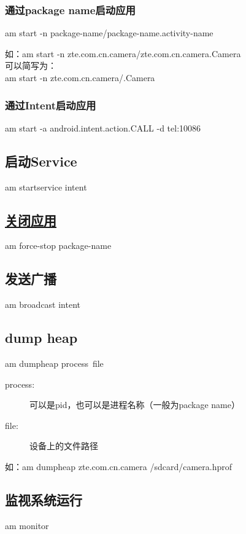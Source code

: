 ﻿\documentclass[a4paper,11pt]{article}
\begin{document}
  \subsubsection[通过package name启动应用]{通过package name启动应用}
  am start -n \lt package-name\gt/\lt package-name.activity-name\gt

  如：am start -n zte.com.cn.camera/zte.com.cn.camera.Camera\\
  可以简写为：\\
  am start -n zte.com.cn.camera/.Camera

  \subsubsection[通过Intent启动应用]{通过Intent启动应用}
  am start -a android.intent.action.CALL -d tel:10086

  \subsection[启动Service]{启动Service}
  am startservice \lt intent\gt

  \subsection[关闭应用]{\underline{关闭应用}}
  am force-stop \lt package-name\gt

  \subsection[发送广播]{发送广播}
  am broadcast \lt intent\gt

  \subsection[dump heap]{dump heap}
  am dumpheap \lt process\gt\ \lt file\gt

  \begin{description}
    \item[process:] 可以是pid，也可以是进程名称（一般为package name）
    \item[file:] 设备上的文件路径
  \end{description}
  如：am dumpheap zte.com.cn.camera /sdcard/camera.hprof

  \subsection[监视系统运行]{监视系统运行}
  am monitor
\end{document}
